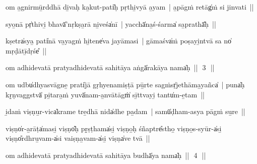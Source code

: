 \documentclass[parskip, DIV=14]{scrartcl}
\begin{document}
{%
om a̱gnirmū̱rddhā di̱vaḥ ka̱kut-pati̍ḥ pṛthi̱vyā a̱yam~| a̱pāgṁ retāg̍ṁ si jinvati~||


syo̱nā pṛ̍thivi̱ bhavā̍'nṛkṣa̱rā ni̱veśa̍nī~| yacchā̍na̱ś-śarma̍ sa̱prathā̎ḥ~||


kṣetra̍sya̱ pati̍nā va̱yagṁ hi̱tene̍va jayāmasi~| gāmaśva̍ṁ poṣayi̱ntvā sa no̍ mṛḍātī̱dṛśe̎~||


om adhidevatā pratyadhidevatā sahitāya aṅgā̍rakāya॒ nama̍ḥ~||~\,3\,~||
\vspace{0.5cm}



om udbu̍dhyasvāgne̱ prati̍jā gṛhyenamiṣṭā pū̱rte sagṁsṛ̍jethāma̱yañca̍~| 
puna̍ḥ kṛ̱ṇvaggstvā̍ pi̱tara̱ṁ yuvā̍nam-a̱nvātāgṁ̍ sī̱ttvayi̱ tantu̍m-e̱tam~||


i̱daṁ viṣṇu̱r-vica̍krame tre̱dhā nida̍dhe pa̱dam~| samū̍ḍham-asya pāgṁ su̱re~||


viṣṇo̍r-a̱rāṭa̍masi̱ viṣṇo̎ḥ pṛ̱ṣṭhama̍si̱ viṣṇo̱ḥ śñaptre̎stho̱ viṣṇo̱s-syūr-a̍si̱ viṣṇo̎rdhru̱vam-a̍si vaiṣṇa̱vam-a̍si̱ viṣṇa̍ve tvā~||


om adhidevatā pratyadhidevatā sahitāya budhā̍ya॒ nama̍ḥ~||~\,4\,~||
\vspace{0.5cm}

}
\end{document}

